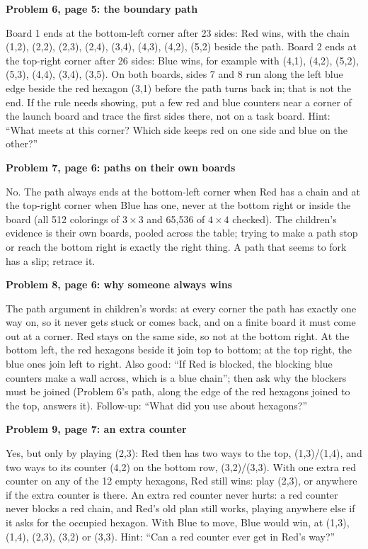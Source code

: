 \documentclass[11pt]{article}
\newcommand{\sub}[1]{\par\textbf{#1}\par\nopagebreak}
\newcommand{\x}{\ensuremath{\times}}
\begin{document}
\sub{Problem 6, page 5: the boundary path}
Board 1 ends at the bottom-left corner after 23 sides: Red wins, with the chain (1,2), (2,2), (2,3), (2,4), (3,4), (4,3), (4,2), (5,2) beside the path. Board 2 ends at the top-right corner after 26 sides: Blue wins, for example with (4,1), (4,2), (5,2), (5,3), (4,4), (3,4), (3,5). On both boards, sides 7 and 8 run along the left blue edge beside the red hexagon (3,1) before the path turns back in; that is not the end. If the rule needs showing, put a few red and blue counters near a corner of the launch board and trace the first sides there, not on a task board. Hint: ``What meets at this corner? Which side keeps red on one side and blue on the other?''
\begin{center}\end{center}

\sub{Problem 7, page 6: paths on their own boards}
No. The path always ends at the bottom-left corner when Red has a chain and at the top-right corner when Blue has one, never at the bottom right or inside the board (all 512 colorings of $3\x3$ and 65{,}536 of $4\x4$ checked). The children's evidence is their own boards, pooled across the table; trying to make a path stop or reach the bottom right is exactly the right thing. A path that seems to fork has a slip; retrace it.

\sub{Problem 8, page 6: why someone always wins}
The path argument in children's words: at every corner the path has exactly one way on, so it never gets stuck or comes back, and on a finite board it must come out at a corner. Red stays on the same side, so not at the bottom right. At the bottom left, the red hexagons beside it join top to bottom; at the top right, the blue ones join left to right. Also good: ``If Red is blocked, the blocking blue counters make a wall across, which is a blue chain''; then ask why the blockers must be joined (Problem 6's path, along the edge of the red hexagons joined to the top, answers it). Follow-up: ``What did you use about hexagons?''

\sub{Problem 9, page 7: an extra counter}
Yes, but only by playing (2,3): Red then has two ways to the top, (1,3)/(1,4), and two ways to its counter (4,2) on the bottom row, (3,2)/(3,3). With one extra red counter on any of the 12 empty hexagons, Red still wins: play (2,3), or anywhere if the extra counter is there. An extra red counter never hurts: a red counter never blocks a red chain, and Red's old plan still works, playing anywhere else if it asks for the occupied hexagon. With Blue to move, Blue would win, at (1,3), (1,4), (2,3), (3,2) or (3,3). Hint: ``Can a red counter ever get in Red's way?''
\end{document}
